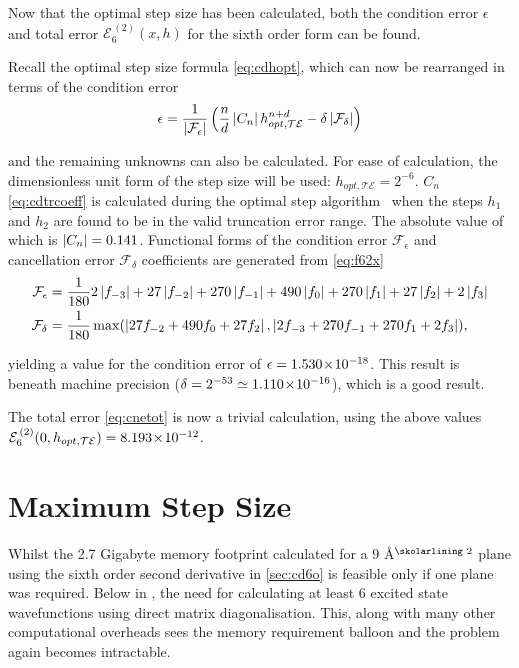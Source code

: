 Now that the optimal step size has been calculated, both the condition error $\epsilon$ and total error $\mathcal{E}_6^{\,(2)}(x,h)$ for the sixth order form can be found.

Recall the optimal step size formula \cref{eq:cdhopt}, which can now be rearranged in terms of the condition error
\begin{equation}
\epsilon = \frac{1}{\left\lvert \mathcal{F}_\epsilon\right\rvert}\left(\frac{n}{d}\left\lvert C_n\right\rvert h_{opt,\mathcal{TE}}^{n+d}-\delta\left\lvert \mathcal{F}_\delta\right\rvert\right)
\end{equation}

and the remaining unknowns can also be calculated.
For ease of calculation, the dimensionless unit form of the step size will be used: $h_{opt,\mathcal{TE}} = 2^{-6}$.
$C_n$ \cref{eq:cdtrcoeff} is calculated during the optimal step algorithm~\cite{Mathur2012} when the steps $h_1$ and $h_2$ are found to be in the valid truncation error range.
The absolute value of which is $\left\lvert C_n\right\rvert = 0.141$.
Functional forms of the condition error $\mathcal{F}_\epsilon$ and cancellation error $\mathcal{F}_\delta$ coefficients are generated from \cref{eq:f62x}
{\mathindent=0.4cm
\begin{align}
\mathcal{F}_\epsilon &= \frac{1}{180}2\left\lvert f_{-3}\right\rvert + 27\left\lvert f_{-2}\right\rvert + 270\left\lvert f_{-1}\right\rvert + 490\left\lvert f_{0}\right\rvert + 270\left\lvert f_{1}\right\rvert + 27\left\lvert f_{2}\right\rvert + 2\left\lvert f_{3}\right\rvert \\
\mathcal{F}_\delta &= \frac{1}{180}\max(\left\lvert 27f_{-2} + 490f_{0} + 27f_{2}\right\rvert,\left\lvert 2f_{-3} + 270f_{-1} + 270f_{1} + 2f_{3}\right\rvert),
\end{align}
}

yielding a value for the condition error of $\epsilon = 1.530\!\times\!10^{-18}$.
This result is beneath machine precision ($\delta = 2^{-53} \simeq 1.110\!\times\!10^{-16}$), which is a good result.

The total error \cref{eq:cnetot} is now a trivial calculation, using the above values $\mathcal{E}_6^{\,(2)}(0,h_{opt,\mathcal{TE}}) = 8.193\!\times\!10^{-12}$.

\section{Maximum Step Size}

Whilst the 2.7 Gigabyte memory footprint calculated for a $9$ Å$^\text{\skolarlining 2}$ plane using the sixth order second derivative in \cref{sec:cd6o} is feasible only if one plane was required.
Below in , the need for calculating at least 6 excited state wavefunctions using direct matrix diagonalisation.
This, along with many other computational overheads sees the memory requirement balloon and the problem again becomes intractable.

